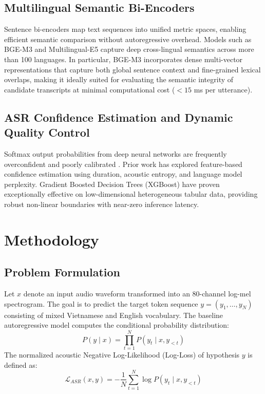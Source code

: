 \documentclass[9pt, conference, a4paper, compsocconf]{IEEEtran}
\begin{document}
\subsection{Multilingual Semantic Bi-Encoders}
Sentence bi-encoders map text sequences into unified metric spaces, enabling efficient semantic comparison without autoregressive overhead. Models such as BGE-M3 \cite{chen2024bge} and Multilingual-E5 \cite{wang2024multilingual} capture deep cross-lingual semantics across more than 100 languages. In particular, BGE-M3 incorporates dense multi-vector representations that capture both global sentence context and fine-grained lexical overlaps, making it ideally suited for evaluating the semantic integrity of candidate transcripts at minimal computational cost ($< 15$ ms per utterance).

\subsection{ASR Confidence Estimation and Dynamic Quality Control}
Softmax output probabilities from deep neural networks are frequently overconfident and poorly calibrated \cite{jiang2005confidence, swietojanski2020confidence}. Prior work has explored feature-based confidence estimation using duration, acoustic entropy, and language model perplexity. Gradient Boosted Decision Trees (XGBoost) \cite{chen2016xgboost} have proven exceptionally effective on low-dimensional heterogeneous tabular data, providing robust non-linear boundaries with near-zero inference latency.

\section{Methodology}

\subsection{Problem Formulation}
Let $x$ denote an input audio waveform transformed into an 80-channel log-mel spectrogram. The goal is to predict the target token sequence $y = (y_1, \dots, y_N)$ consisting of mixed Vietnamese and English vocabulary. The baseline autoregressive model computes the conditional probability distribution:
\begin{equation}
P(y \mid x) = \prod_{t=1}^N P(y_t \mid x, y_{<t})
\end{equation}
The normalized acoustic Negative Log-Likelihood (Log-Loss) of hypothesis $y$ is defined as:
\begin{equation}
\mathcal{L}_{ASR}(x, y) = -\frac{1}{N} \sum_{t=1}^N \log P(y_t \mid x, y_{<t})
\end{equation}
\end{document}
